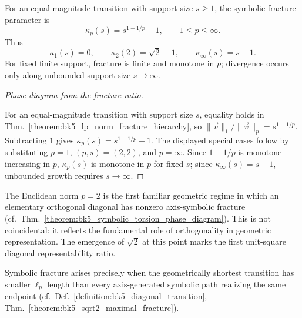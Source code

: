 \begin{theorem}
\label{theorem:bk5_symbolic_torsion_phase_diagram}
For an equal-magnitude transition with support size $s\geq1$, the symbolic
fracture parameter is
\[
\kappa_p(s)=s^{1-1/p}-1,\qquad 1\leq p\leq\infty.
\]
Thus
\[
\kappa_1(s)=0,\qquad
\kappa_2(2)=\sqrt{2}-1,\qquad
\kappa_\infty(s)=s-1.
\]
For fixed finite support, fracture is finite and monotone in $p$; divergence
occurs only along unbounded support size $s\to\infty$.
\end{theorem}

\begin{proof}[Phase diagram from the fracture ratio]
\label{proof:bk5_symbolic_torsion_phase_diagram}
\leavevmode

For an equal-magnitude transition with support size $s$, equality holds in
Thm.~\ref{theorem:bk5_lp_norm_fracture_hierarchy}, so
$\|\vec{v}\|_1/\|\vec{v}\|_p=s^{1-1/p}$.  Subtracting $1$ gives
$\kappa_p(s)=s^{1-1/p}-1$.  The displayed special cases follow by substituting
$p=1$, $(p,s)=(2,2)$, and $p=\infty$.  Since $1-1/p$ is monotone increasing
in $p$, $\kappa_p(s)$ is monotone in $p$ for fixed $s$; since
$\kappa_\infty(s)=s-1$, unbounded growth requires $s\to\infty$.
\end{proof}

\begin{scholium}[Critical Point at p=2]
\label{scholium:bk5_critical_point_p2}
The Euclidean norm $p = 2$ is the first familiar geometric regime in which an
elementary orthogonal diagonal has nonzero axis-symbolic fracture
(cf.~Thm.~\ref{theorem:bk5_symbolic_torsion_phase_diagram}). This is not
coincidental: it reflects the fundamental role of orthogonality in geometric
representation. The emergence of $\sqrt{2}$ at this point marks the first
unit-square diagonal representability ratio.
\end{scholium}

\begin{lemma}
\label{lemma:bk5_shortest_path_representability}
Symbolic fracture arises precisely when the geometrically shortest transition
has smaller $\ell_p$ length than every axis-generated symbolic path realizing
the same endpoint (cf.~Def.~\ref{definition:bk5_diagonal_transition},
Thm.~\ref{theorem:bk5_sqrt2_maximal_fracture}).
\end{lemma}

